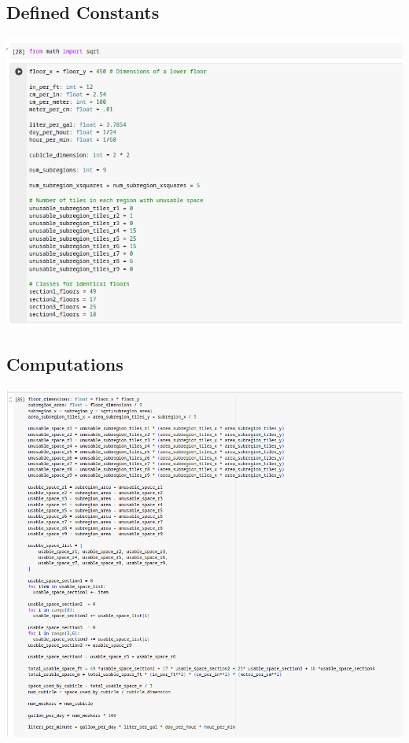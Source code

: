 \documentclass{report}
\begin{document}
    \subsection{Defined Constants}
    \begin{center}
        \includegraphics[scale=.5]{./figures/1.png  }
    \end{center}


    \bigbreak \noindent 
    \subsection{Computations}
        \begin{center}
        \includegraphics[scale=.5]{./figures/2.png  }
    \end{center}










    
\end{document}
